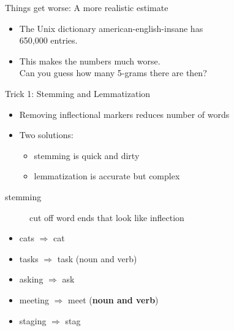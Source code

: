 \documentclass[professionalfonts, xcolor={usenames,svgnames,x11names,table}]{beamer}
\begin{document}
\begin{frame}{Things get worse: A more realistic estimate}
    \begin{itemize}
        \item The Unix dictionary american-english-insane has\\
            650,000 entries.
        \item This makes the numbers much worse.\\
            Can you guess how many 5-grams there are then?
    \end{itemize}

    \begin{center}
    \end{center}
        
    \medskip
\end{frame}

\begin{frame}{Trick 1: Stemming and Lemmatization}
    \begin{itemize}
        \item Removing inflectional markers reduces number of words
        \item Two solutions:
            \begin{itemize}
                \item stemming is quick and dirty
                \item lemmatization is accurate but complex
            \end{itemize}
    \end{itemize}

    \begin{description}
        \item[stemming] cut off word ends that look like inflection
    \end{description}

    \begin{example}
        \begin{itemize}
            \item cats $\Rightarrow$ cat
            \item tasks $\Rightarrow$ task (noun and verb)
            \item asking $\Rightarrow$ ask
            \item meeting $\Rightarrow$ meet (\textbf{noun and verb})
            \item staging $\Rightarrow$ stag
        \end{itemize}
    \end{example}
\end{frame}
\end{document}
